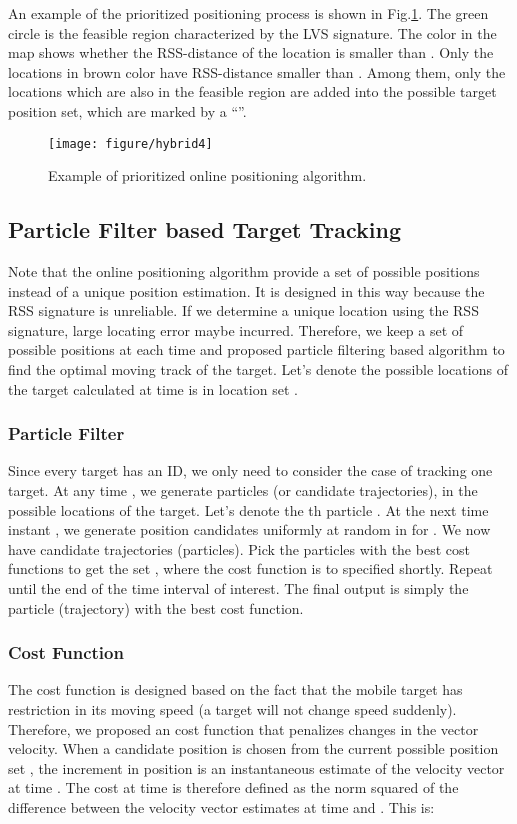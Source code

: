 \documentclass[conference, 10pt]{IEEEtran}
\begin{document}
An example of the prioritized positioning process is shown in Fig.\ref{fig4}. The green circle is the feasible region characterized by the LVS signature. The color in the map shows whether the RSS-distance of the location is smaller than . Only the locations in brown color have RSS-distance smaller than . Among them, only the locations which are also in the feasible region are added into the possible target position set, which are marked by a ``\checkmark''.

 
\begin{figure}[htbp]
\begin{center}
\texttt{[image: figure/hybrid4]}
\caption{Example of prioritized online positioning algorithm.}
\label{fig4}
\end{center}
\end{figure}

\subsection{Particle Filter based Target Tracking}
Note that the online positioning algorithm provide a set of possible positions instead of a unique position estimation. It is designed in this way because the RSS signature is unreliable. If we determine a unique location using the RSS signature, large locating error maybe incurred. Therefore, we keep a set of possible positions at each time and proposed particle filtering based algorithm to find the optimal moving track of the target.  Let's denote the possible locations of the target calculated at time  is in location set . 
\subsubsection{Particle Filter}
Since every target has an ID, we only need to consider the case of tracking one target. At any time , we generate  particles (or candidate trajectories), in the possible locations of the target. Let's denote the th particle . At the next time instant , we generate  position candidates uniformly at random in  for . We now have  candidate trajectories (particles). Pick the  particles with the best cost functions to get the set , where the cost function is to specified shortly. Repeat until the end of the time interval of interest. The final output
is simply the particle (trajectory) with the best cost function.


 
\subsubsection{Cost Function} The cost function is designed based on the fact that the mobile target has restriction in its moving speed (a target will not change speed suddenly). Therefore, we proposed an cost function that penalizes changes in the vector velocity. When a candidate position  is chosen from the current possible position set ,  the increment in position  is an instantaneous estimate of the velocity vector at time . The cost at time  is therefore defined as the norm squared of the difference between the velocity vector estimates at time  and . This is:
\end{document}
